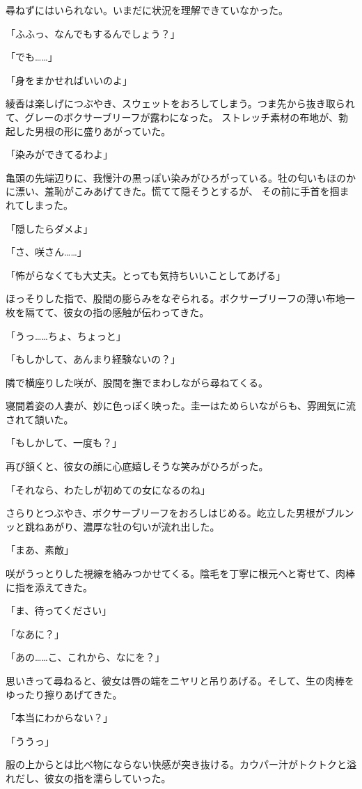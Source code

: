 ﻿\documentclass[
    book,tate,
    line_length=30zw,
    jafontsize=12pt,
    paper=b5j,
    landscape,
    ]{jlreq}
\begin{document}
尋ねずにはいられない。いまだに状況を理解できていなかった。

「ふふっ、なんでもするんでしょう？」

「でも……」

「身をまかせればいいのよ」

綾香は楽しげにつぶやき、スウェットをおろしてしまう。つま先から抜き取られて、グレーのボクサーブリーフが露わになった。
ストレッチ素材の布地が、勃起した男根の形に盛りあがっていた。

「染みができてるわよ」

亀頭の先端辺りに、我慢汁の黒っぽい染みがひろがっている。牡の匂いもほのかに漂い、羞恥がこみあげてきた。慌てて隠そうとするが、
その前に手首を掴まれてしまった。

「隠したらダメよ」

「さ、咲さん……」

「怖がらなくても大丈夫。とっても気持ちいいことしてあげる」

ほっそりした指で、股間の膨らみをなぞられる。ボクサーブリーフの薄い布地一枚を隔てて、彼女の指の感触が伝わってきた。

「うっ……ちょ、ちょっと」

「もしかして、あんまり経験ないの？」

隣で横座りした咲が、股間を撫でまわしながら尋ねてくる。

寝間着姿の人妻が、妙に色っぽく映った。圭一はためらいながらも、雰囲気に流されて頷いた。

「もしかして、一度も？」

再び頷くと、彼女の顔に心底嬉しそうな笑みがひろがった。

「それなら、わたしが初めての女になるのね」

さらりとつぶやき、ボクサーブリーフをおろしはじめる。屹立した男根がブルンッと跳ねあがり、濃厚な牡の匂いが流れ出した。

「まあ、素敵」

咲がうっとりした視線を絡みつかせてくる。陰毛を丁寧に根元へと寄せて、肉棒に指を添えてきた。

「ま、待ってください」

「なあに？」

「あの……こ、これから、なにを？」

思いきって尋ねると、彼女は唇の端をニヤリと吊りあげる。そして、生の肉棒をゆったり擦りあげてきた。

「本当にわからない？」

「ううっ」

服の上からとは比べ物にならない快感が突き抜ける。カウパー汁がトクトクと溢れだし、彼女の指を濡らしていった。
\end{document}
